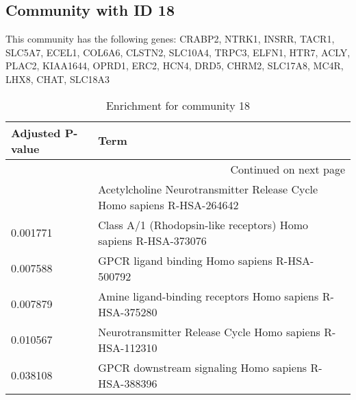 \subsection*{Community with ID 18}
This community has the following genes: CRABP2, NTRK1, INSRR, TACR1, SLC5A7, ECEL1, COL6A6, CLSTN2, SLC10A4, TRPC3, ELFN1, HTR7, ACLY, PLAC2, KIAA1644, OPRD1, ERC2, HCN4, DRD5, CHRM2, SLC17A8, MC4R, LHX8, CHAT, SLC18A3
\\
\begin{longtable}{p{2.4cm}p{14.5cm}}
\caption{Enrichment for community 18}\\
\toprule
Adjusted \newline P-value &                                                                    Term \\
\midrule
\endhead
\midrule
\multicolumn{2}{r}{{Continued on next page}} \\
\midrule
\endfoot

\bottomrule
\endlastfoot
                 0.001774 &  Acetylcholine Neurotransmitter Release Cycle Homo sapiens R-HSA-264642 \\
                 0.001771 &          Class A/1 (Rhodopsin-like receptors) Homo sapiens R-HSA-373076 \\
                 0.007588 &                           GPCR ligand binding Homo sapiens R-HSA-500792 \\
                 0.007879 &                Amine ligand-binding receptors Homo sapiens R-HSA-375280 \\
                 0.010567 &                Neurotransmitter Release Cycle Homo sapiens R-HSA-112310 \\
                 0.038108 &                     GPCR downstream signaling Homo sapiens R-HSA-388396 \\
\end{longtable}



